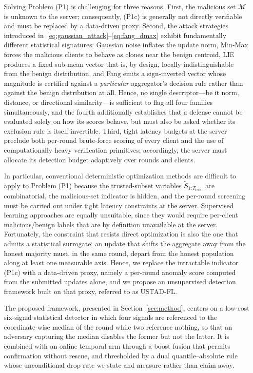\documentclass[journal]{IEEEtran}
\begin{document}
Solving Problem (P1) is challenging for three reasons. First, the malicious set $\mathcal{M}$ is unknown to the server; consequently, (P1c) is generally not directly verifiable and must be replaced by a data-driven proxy. Second, the attack strategies introduced in~\eqref{eq:gaussian_attack}--\eqref{eq:fang_dmax} exhibit fundamentally different statistical signatures: Gaussian noise inflates the update norm, Min-Max forces the malicious clients to behave as clones near the benign centroid, LIE produces a fixed sub-mean vector that is, by design, locally indistinguishable from the benign distribution, and Fang emits a sign-inverted vector whose magnitude is certified against a \emph{particular} aggregator's decision rule rather than against the benign distribution at all. Hence, no single descriptor—be it norm, distance, or directional similarity—is sufficient to flag all four families simultaneously, and the fourth additionally establishes that a defense cannot be evaluated solely on how its scores behave, but must also be asked whether its exclusion rule is itself invertible. Third, tight latency budgets at the server preclude both per-round brute-force scoring of every client and the use of computationally heavy verification primitives; accordingly, the server must allocate its detection budget adaptively over rounds and clients.

In particular, conventional deterministic optimization methods are difficult to apply to Problem (P1) because the trusted-subset variables $\widetilde{S}_{1:T_{\text{total}}}$ are combinatorial, the malicious-set indicator is hidden, and the per-round screening must be carried out under tight latency constraints at the server. Supervised learning approaches are equally unsuitable, since they would require per-client malicious/benign labels that are by definition unavailable at the server. Fortunately, the constraint that resists direct optimization is also the one that admits a statistical surrogate: an update that shifts the aggregate away from the honest majority must, in the same round, depart from the honest population along at least one measurable axis. Hence, we replace the intractable indicator (P1c) with a data-driven proxy, namely a per-round anomaly score computed from the submitted updates alone, and we propose an unsupervised detection framework built on that proxy, referred to as USTAD-FL.

The proposed framework, presented in Section~\ref{sec:method}, centers on a low-cost six-signal statistical detector in which four signals are referenced to the coordinate-wise median of the round while two reference nothing, so that an adversary capturing the median disables the former but not the latter. It is combined with an online temporal arm through a boost fusion that permits confirmation without rescue, and thresholded by a dual quantile--absolute rule whose unconditional drop rate we state and measure rather than claim away.
\end{document}
